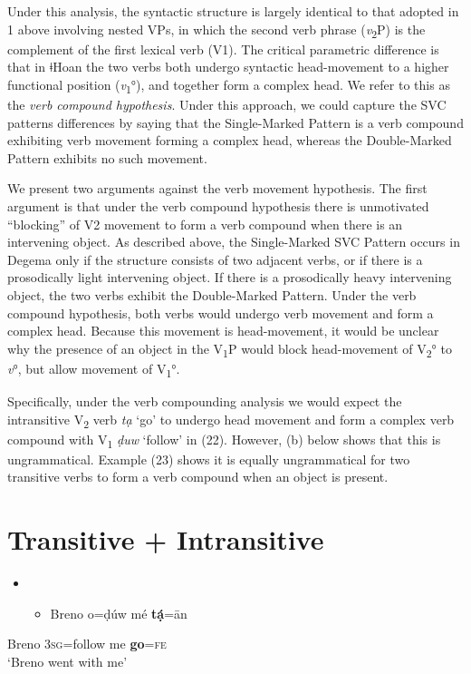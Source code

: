 Under this analysis, the syntactic structure is largely identical to that adopted in 1 above involving nested VPs, in which the second verb phrase (\textit{v}\textsubscript{2}P) is the complement of the first lexical verb (V1). The critical parametric difference is that in ǂHoan the two verbs both undergo syntactic head-movement to a higher functional position (\textit{v}\textsubscript{1}°), and together form a complex head. We refer to this as the \textit{verb compound hypothesis}. Under this approach, we could capture the SVC patterns differences by saying that the Single-Marked Pattern is a verb compound exhibiting verb movement forming a complex head, whereas the Double-Marked Pattern exhibits no such movement. 

We present two arguments against the verb movement hypothesis. The first argument is that under the verb compound hypothesis there is unmotivated “blocking” of V2 movement to form a verb compound when there is an intervening object. As described above, the Single-Marked SVC Pattern occurs in Degema only if the structure consists of two adjacent verbs, or if there is a prosodically light intervening object. If there is a prosodically heavy intervening object, the two verbs exhibit the Double-Marked Pattern. Under the verb compound hypothesis, both verbs would undergo verb movement and form a complex head. Because this movement is head-movement, it would be unclear why the presence of an object in the V\textsubscript{1}P would block head-movement of V\textsubscript{2}° to \textit{v}°, but allow movement of V\textsubscript{1}°.

Specifically, under the verb compounding analysis we would expect the intransitive V\textsubscript{2} verb \textit{tạ }‘go’ to undergo head movement and form a complex verb compound with V\textsubscript{1} \textit{ḍuw} ‘follow’ in (22). However, (b) below shows that this is ungrammatical. Example (23) shows it is equally ungrammatical for two transitive verbs to form a verb compound when an object is present. 

\chapter[Transitive + Intransitive]{Transitive + Intransitive}
\label{bkm:Ref419990324}\begin{itemize}
\item \setcounter{itemize}{0}
\begin{itemize}
\item \gll Breno   o=ḍúw    mé   \textbf{tạ́}=\={a}n\\
\end{itemize}
\end{itemize}
     Breno   3\textsc{sg}=follow   me   \textbf{go}=\textsc{fe}\\
\glt ‘Breno went with me’ \citep[115]{Kari2004}
\z

